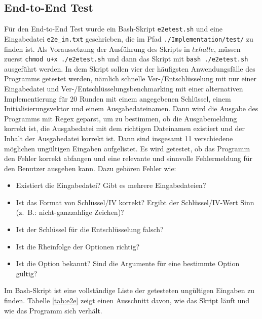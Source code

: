 \documentclass[course=erap]{aspdoc}
\begin{document}
\subsection{End-to-End Test}
Für den End-to-End Test wurde ein Bash-Skript \lstinline{e2etest.sh} und eine Eingabedatei \lstinline{e2e_in.txt} geschrieben, die im Pfad \lstinline{./Implementation/test/} zu finden ist. Als Voraussetzung der Ausführung des Skripts in $lxhalle$, müssen zuerst \lstinline{chmod u+x ./e2etest.sh} und dann das Skript mit \lstinline{bash ./e2etest.sh} ausgeführt werden. In dem Skript sollen vier der häufigsten Anwendungsfälle des Programms getestet werden, nämlich schnelle Ver-/Entschlüsselung mit nur einer Eingabedatei und Ver-/Entschlüsselungsbenchmarking mit einer alternativen Implementierung für 20 Runden mit einem angegebenen Schlüssel, einem Initialisierungsvektor und einem Ausgabedateinamen. Dann wird die Ausgabe des Programms mit Regex geparst, um zu bestimmen, ob die Ausgabemeldung korrekt ist, die Ausgabedatei mit dem richtigen Dateinamen existiert und der Inhalt der Ausgabedatei korrekt ist. 
Dann sind insgesamt 11 verschiedene möglichen ungültigen Eingaben aufgelistet. Es wird getestet, ob das Programm den Fehler korrekt abfangen und eine relevante und sinnvolle Fehlermeldung für den Benutzer ausgeben kann. Dazu gehören Fehler wie:
\begin{itemize}
    \item Existiert die Eingabedatei? Gibt es mehrere Eingabedateien?
    \item Ist das Format von Schlüssel/IV korrekt? Ergibt der Schlüssel/IV-Wert Sinn (z. B.: nicht-ganzzahlige Zeichen)?
    \item Ist der Schlüssel für die Entschlüsselung falsch?
    \item Ist die Rheinfolge der Optionen richtig?
    \item Ist die Option bekannt? Sind die Argumente für eine bestimmte Option gültig?
\end{itemize}
Im Bash-Skript ist eine vollständige Liste der getesteten ungültigen Eingaben zu finden. Tabelle \ref{tab:e2e} zeigt einen Ausschnitt davon, wie das Skript läuft und wie das Programm sich verhält.
\end{document}
